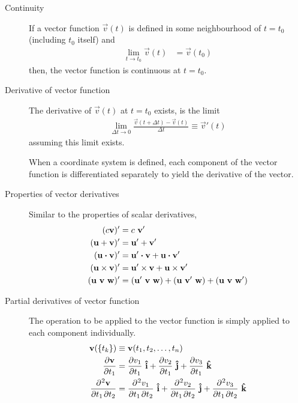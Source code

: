 \begin{description}
    \item[Continuity] If a vector function $ \vec{v}(t) $ is defined in some
        neighbourhood of $ t = t_0 $ (including $ t_0 $ itself) and
        \begin{align}
            \lim_{t \rightarrow t_0} \vec{v}(t) & = \vec{v}(t_0)
        \end{align}
        then, the vector function is continuous at $ t = t_0 $.

    \item[Derivative of vector function] The derivative of $ \vec{v}(t) $ at $ t= t_0 $
        exists, is the limit
        \begin{align}
            \lim_{\Delta t \rightarrow 0} \frac{\vec{v}(t + \Delta t) - \vec{v}(t)}
            {\Delta t} \equiv \vec{v}'(t)
        \end{align}
        assuming this limit exists. \par
        When a coordinate system is defined, each component of the vector function is
        differentiated separately to yield the derivative of the vector.

    \item[Properties of vector derivatives] Similar to the properties of scalar
        derivatives,
        \begin{align}
            (c\vec{v})'                  & = c\ \vec{v}'                  \\
            (\vec{u} + \vec{v})'         & = \vec{u}' + \vec{v}'          \\
            (\vec{u} \dotp \vec{v})'     &
            = \vec{u}' \dotp \vec{v} + \vec{u} \dotp \vec{v}'             \\
            (\vec{u} \times \vec{v})'    &
            = \vec{u}' \times \vec{v} + \vec{u} \times \vec{v}'           \\
            (\vec{u}\ \vec{v}\ \vec{w})' & = (\vec{u}'\ \vec{v}\ \vec{w})
            + (\vec{u}\ \vec{v}'\ \vec{w}) + (\vec{u}\ \vec{v}\ \vec{w}')
        \end{align}

    \item[Partial derivatives of vector function] The operation to be applied to the
        vector function is simply applied to each component individually.
        \begin{align}
            \vec{v}(\{t_k\})          & \equiv \vec{v}(t_1, t_2, \dots, t_n)   \\
            \diffp{\vec{v}}{t_1}      & = \diffp{v_1}{t_1}\ \vec{\hat{i}}
            + \diffp{v_2}{t_1}\ \vec{\hat{j}}
            + \diffp{v_3}{t_1}\ \vec{\hat{k}}                                  \\
            \diffp{\vec{v}}{t_1, t_2} & = \diffp{v_1}{t_1, t_2}\ \vec{\hat{i}}
            + \diffp{v_2}{t_1, t_2}\ \vec{\hat{j}}
            + \diffp{v_3}{t_1, t_2}\ \vec{\hat{k}}
        \end{align}
\end{description}


